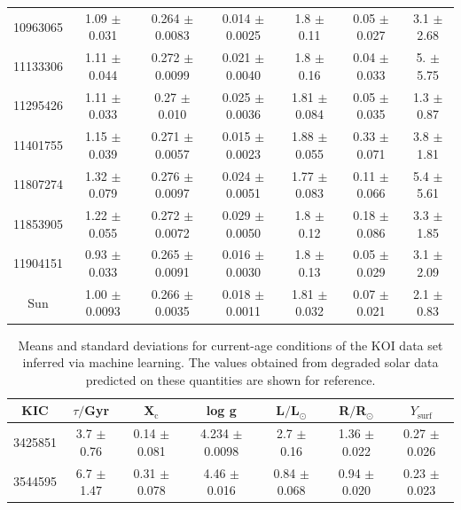 {\begin{table}
\begin{tabular}{ccccccc}
10963065 & 1.09 $\pm$ 0.031  & 0.264 $\pm$ 0.0083 & 0.014 $\pm$ 0.0025 & 1.8  $\pm$ 0.11  & 0.05 $\pm$ 0.027 &  3.1 $\pm$  2.68 \\
11133306 & 1.11 $\pm$ 0.044  & 0.272 $\pm$ 0.0099 & 0.021 $\pm$ 0.0040 & 1.8  $\pm$ 0.16  & 0.04 $\pm$ 0.033 &  5.  $\pm$  5.75 \\
11295426 & 1.11 $\pm$ 0.033  & 0.27  $\pm$ 0.010  & 0.025 $\pm$ 0.0036 & 1.81 $\pm$ 0.084 & 0.05 $\pm$ 0.035 &  1.3 $\pm$  0.87 \\
11401755 & 1.15 $\pm$ 0.039  & 0.271 $\pm$ 0.0057 & 0.015 $\pm$ 0.0023 & 1.88 $\pm$ 0.055 & 0.33 $\pm$ 0.071 &  3.8 $\pm$  1.81 \\
11807274 & 1.32 $\pm$ 0.079  & 0.276 $\pm$ 0.0097 & 0.024 $\pm$ 0.0051 & 1.77 $\pm$ 0.083 & 0.11 $\pm$ 0.066 &  5.4 $\pm$  5.61 \\
11853905 & 1.22 $\pm$ 0.055  & 0.272 $\pm$ 0.0072 & 0.029 $\pm$ 0.0050 & 1.8  $\pm$ 0.12  & 0.18 $\pm$ 0.086 &  3.3 $\pm$  1.85 \\
11904151 & 0.93 $\pm$ 0.033  & 0.265 $\pm$ 0.0091 & 0.016 $\pm$ 0.0030 & 1.8  $\pm$ 0.13  & 0.05 $\pm$ 0.029 &  3.1 $\pm$  2.09 \\
Sun & 1.00 $\pm$ 0.0093 & 0.266 $\pm$ 0.0035 & 0.018 $\pm$ 0.0011 & 1.81 $\pm$ 0.032 & 0.07 $\pm$ 0.021 &  2.1 $\pm$  0.83 \\ \hline \end{tabular}
\end{table}
\clearpage
\begin{table}
\caption{Means and standard deviations for current-age conditions of the KOI data set inferred via machine learning. The values obtained from degraded solar data predicted on these quantities are shown for reference. \label{tab:results-kages-curr}}
\hspace*{-2.2cm}\begin{tabular}{ccccccc}
KIC & $\tau/$Gyr & X$_{\mathrm{c}}$ & log g & L$/$L$_\odot$ & R$/$R$_\odot$ & $Y_{\mathrm{surf}}$ \\ \hline\hline
 3425851 &  3.7 $\pm$ 0.76  & 0.14  $\pm$ 0.081  & 4.234 $\pm$ 0.0098 & 2.7  $\pm$ 0.16  & 1.36  $\pm$ 0.022  & 0.27  $\pm$ 0.026 \\
 3544595 &  6.7 $\pm$ 1.47  & 0.31  $\pm$ 0.078  & 4.46  $\pm$ 0.016  & 0.84 $\pm$ 0.068 & 0.94  $\pm$ 0.020  & 0.23  $\pm$ 0.023 \\

\end{tabular}
\end{table}}
